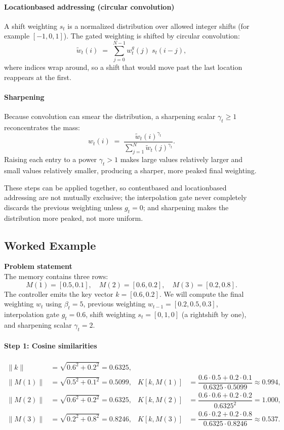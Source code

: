 \documentclass[12pt, a4paper]{article}
\begin{document}
{\paragraph{Locationbased addressing (circular convolution)}
A shift weighting \(s_t\) is a normalized distribution over allowed integer shifts (for example \([-1,0,1]\)).  
The gated weighting is shifted by circular convolution:
\[
\tilde{w}_t(i)\;=\;\sum_{j=0}^{N-1} w_t^{g}(j)\;s_t(i-j),
\]
where indices wrap around, so a shift that would move past the last location reappears at the first.

\paragraph{Sharpening}
Because convolution can smear the distribution, a sharpening scalar \(\gamma_t\ge 1\) reconcentrates the mass:
\[
w_t(i)\;=\;
\frac{\tilde{w}_t(i)^{\gamma_t}}
     {\displaystyle\sum_{j=1}^{N}\tilde{w}_t(j)^{\gamma_t}} .
\]
Raising each entry to a power \(\gamma_t>1\) makes large values relatively larger and small values relatively smaller, producing a sharper, more peaked final weighting.

These steps can be applied together, so contentbased and locationbased addressing are not mutually exclusive; the interpolation gate never completely discards the previous weighting unless \(g_t=0\); and sharpening makes the distribution more peaked, not more uniform.

\subsection{Worked Example}
\textbf{Problem statement}\\
The memory contains three rows:
\[
M(1)=[0.5,0.1],\quad
M(2)=[0.6,0.2],\quad
M(3)=[0.2,0.8].
\]
The controller emits the key vector \(k=[0.6,0.2]\).  
We will compute the final weighting \(w_t\) using \(\beta_t=5\), previous weighting \(w_{t-1}=[0.2,0.5,0.3]\), interpolation gate \(g_t=0.6\), shift weighting \(s_t=[0,1,0]\) (a rightshift by one), and sharpening scalar \(\gamma_t=2\).

\paragraph{Step 1: Cosine similarities}
\[
\begin{aligned}
\|k\| &= \sqrt{0.6^2+0.2^2}=0.6325,\\
\|M(1)\| &= \sqrt{0.5^2+0.1^2}=0.5099, &
K[k,M(1)] &= \dfrac{0.6\cdot0.5+0.2\cdot0.1}{0.6325\cdot0.5099}\approx0.994,\\[4pt]
\|M(2)\| &= \sqrt{0.6^2+0.2^2}=0.6325, &
K[k,M(2)] &= \dfrac{0.6\cdot0.6+0.2\cdot0.2}{0.6325^2}=1.000,\\[4pt]
\|M(3)\| &= \sqrt{0.2^2+0.8^2}=0.8246, &
K[k,M(3)] &= \dfrac{0.6\cdot0.2+0.2\cdot0.8}{0.6325\cdot0.8246}\approx0.537.
\end{aligned}
\]

}
\end{document}
